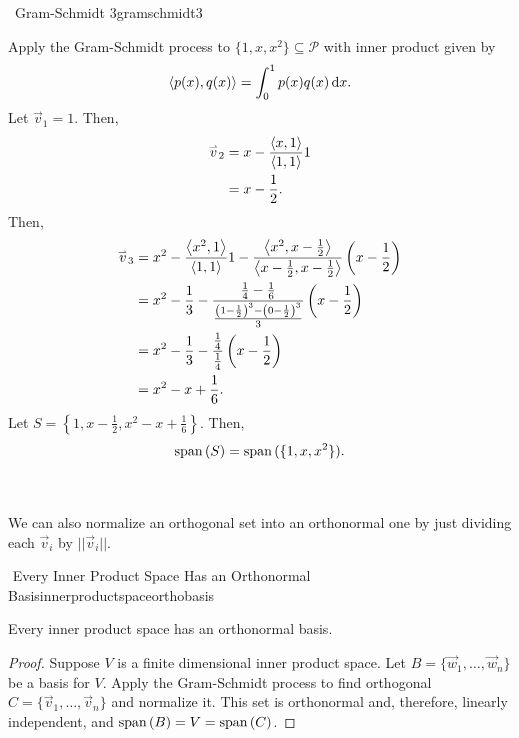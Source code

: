         \begin{example}{\Difficulty\,\Difficulty\,\,Gram-Schmidt 3}{gramschmidt3}
            
            Apply the Gram-Schmidt process to \(\{1,x,x^2\}\subseteq\mathcal{P}\) with inner product given by
            \begin{equation*}
                \left\langle p(x),q(x)\right\rangle=\int_0^1 p(x)q(x) \,\text{d} x.
            \end{equation*}
            Let \(\vec{v}_1=1\). Then,
            \begin{align*}
                \overset{_{\rightharpoonup}}{v}_2&=x-\frac{\left\langle x,1\right\rangle}{\left\langle 1,1\right\rangle}1 \\
                &=x-\frac{1}{2}.
            \end{align*}
            Then,
            \begin{align*}
                \overset{_{\rightharpoonup}}{v}_3&=x^2-\frac{\left\langle x^2,1\right\rangle}{\left\langle 1,1\right\rangle}1-\frac{\left\langle x^2,x-\frac{1}{2}\right\rangle}{\left\langle x-\frac{1}{2},x-\frac{1}{2}\right\rangle}\left(x-\frac{1}{2}\right) \\
                &=x^2-\frac{1}{3}-\frac{\frac{1}{4}-\frac{1}{6}}{\frac{\left(1-\frac{1}{2}\right)^3-\left(0-\frac{1}{2}\right)^3}{3}}\left(x-\frac{1}{2}\right) \\
                &=x^2-\frac{1}{3}-\frac{\frac{1}{4}}{\frac{1}{4}}\left(x-\frac{1}{2}\right) \\
                &=x^2-x+\frac{1}{6}.
            \end{align*}
            Let \(S=\left\{1,x-\frac{1}{2},x^2-x+\frac{1}{6}\right\}\). Then,
            \begin{equation*}
                \text{span\,}(S)=\text{span\,}(\{1,x,x^2\}).
            \end{equation*}
            
        \end{example}
        \vphantom
        \\
        \\
        We can also normalize an orthogonal set into an orthonormal one by just dividing each \(\vec{v}_i\) by \(||\vec{v}_i||\).
        \begin{theorem}{\Stop\,\,Every Inner Product Space Has an Orthonormal Basis}{innerproductspaceorthobasis}

            Every inner product space has an orthonormal basis.
            \begin{proof}
                Suppose \(V\) is a finite dimensional inner product space. Let \(B=\{\vec{w}_1,\ldots,\vec{w}_n\}\) be a basis for \(V\). Apply the Gram-Schmidt process to find orthogonal \(C=\{\vec{v}_1,\ldots,\vec{v}_n\}\) and normalize it. This set is orthonormal and, therefore, linearly independent, and \(\text{span\,}(B)=V=\text{span\,}(C)\).
            \end{proof}
            
        \end{theorem}

